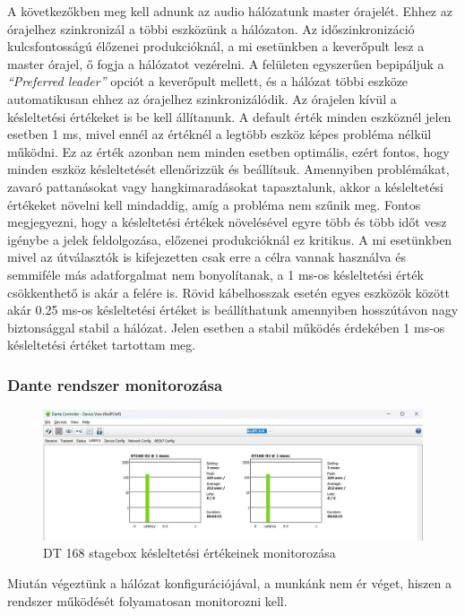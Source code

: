 A következőkben meg kell adnunk az audio hálózatunk master órajelét. Ehhez az órajelhez
szinkronizál a többi eszközünk a hálózaton.
Az időszinkronizáció kulcsfontosságú élőzenei produkcióknál,
a mi esetünkben a keverőpult lesz a master órajel, ő fogja a hálózatot
vezérelni. A felületen egyszerűen bepipáljuk a \textit{``Preferred leader''} opciót
a keverőpult mellett, és a hálózat többi eszköze automatikusan ehhez az órajelhez szinkronizálódik.
Az órajelen kívül a késleltetési értékeket is be kell állítanunk. A default érték minden eszköznél jelen esetben
1 ms, mivel ennél az értéknél a legtöbb eszköz képes probléma nélkül működni. Ez az érték azonban
nem minden esetben optimális, ezért fontos, hogy minden eszköz késleltetését ellenőrizzük és beállítsuk.
Amennyiben problémákat, zavaró pattanásokat vagy hangkimaradásokat tapasztalunk, akkor a késleltetési értékeket
növelni kell mindaddig, amíg a probléma nem szűnik meg. Fontos megjegyezni, hogy a késleltetési értékek
növelésével egyre több és több időt vesz igénybe a jelek feldolgozása, előzenei produkcióknál ez kritikus.
A mi esetünkben mivel az útválasztók is kifejezetten csak erre a célra vannak használva és semmiféle más
adatforgalmat nem bonyolítanak, a 1 ms-os késleltetési érték csökkenthető is akár a felére is.
Rövid kábelhosszak esetén egyes eszközök között akár 0.25 ms-os késleltetési értéket is beállíthatunk amennyiben
hosszútávon nagy biztonsággal stabil a hálózat. Jelen esetben a stabil működés érdekében 1 ms-os késleltetési értéket
tartottam meg.
\subsubsection{Dante rendszer monitorozása}
\begin{figure}[H]
	\centering
	\includegraphics[width=\textwidth, keepaspectratio]{figures/dante_latency.jpg}
	\caption{DT 168 stagebox késleltetési értékeinek monitorozása}\label{fig:dante_latency}
\end{figure}
Miután végeztünk a hálózat konfigurációjával, a munkánk nem ér véget, hiszen
a rendszer működését folyamatosan monitorozni kell. 





